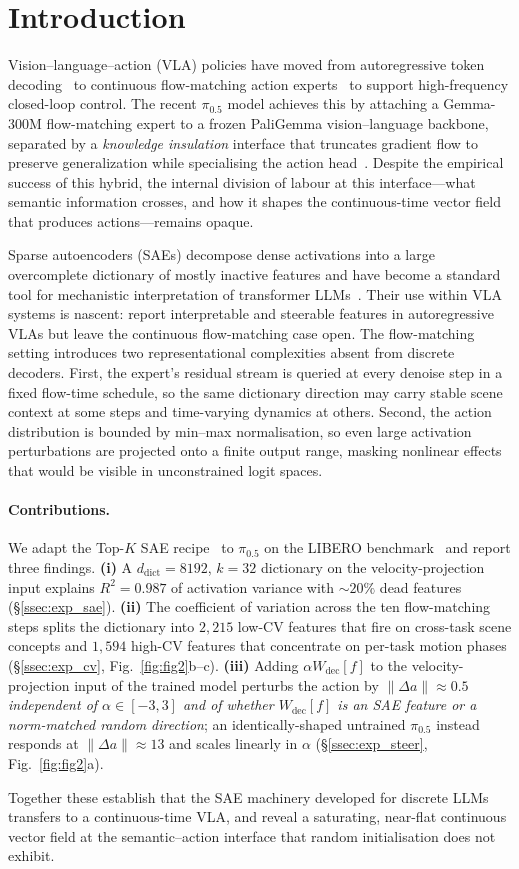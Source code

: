\section{Introduction}
\label{sec:intro}

Vision--language--action (VLA) policies have moved from autoregressive token
decoding~\citep{kim2024openvla} to continuous flow-matching action
experts~\citep{black2024pi0,black2025pi05} to support high-frequency closed-loop
control. The recent $\pi_{0.5}$ model achieves this by attaching a Gemma-300M
flow-matching expert to a frozen PaliGemma vision--language backbone, separated
by a \emph{knowledge insulation} interface that truncates gradient flow to
preserve generalization while specialising the action head~\citep{black2025pi05}.
Despite the empirical success of this hybrid, the internal division of labour
at this interface---what semantic information crosses, and how it shapes the
continuous-time vector field that produces actions---remains opaque.

Sparse autoencoders (SAEs) decompose dense activations into a large
overcomplete dictionary of mostly inactive features and have become a
standard tool for mechanistic interpretation of transformer
LLMs~\citep{cunningham2023sparse,bricken2023monosemanticity,gao2024scaling}.
Their use within VLA systems is nascent: \citet{swann2026sae} report
interpretable and steerable features in autoregressive VLAs but leave the
continuous flow-matching case open. The flow-matching setting introduces two
representational complexities absent from discrete decoders. First, the
expert's residual stream is queried at every denoise step in a fixed flow-time
schedule, so the same dictionary direction may carry stable scene context at
some steps and time-varying dynamics at others. Second, the action distribution
is bounded by min--max normalisation, so even large activation perturbations
are projected onto a finite output range, masking nonlinear effects that would
be visible in unconstrained logit spaces.

\paragraph{Contributions.}
We adapt the Top-$K$ SAE recipe~\citep{gao2024scaling} to $\pi_{0.5}$ on the
LIBERO benchmark~\citep{liu2023libero} and report three findings.
\textbf{(i)} A $d_\text{dict}{=}8192$, $k{=}32$ dictionary on the
velocity-projection input explains $R^2{=}0.987$ of activation variance with
$\sim$$20\%$ dead features (\S\ref{ssec:exp_sae}).
\textbf{(ii)} The coefficient of variation across the ten flow-matching steps
splits the dictionary into $2{,}215$ low-CV features that fire on cross-task
scene concepts and $1{,}594$ high-CV features that concentrate on per-task
motion phases (\S\ref{ssec:exp_cv}, Fig.~\ref{fig:fig2}b--c).
\textbf{(iii)} Adding $\alpha W_\text{dec}[f]$ to the velocity-projection input
of the trained model perturbs the action by $\|\Delta a\|{\approx}0.5$
\emph{independent of $\alpha\in[-3,3]$ and of whether $W_\text{dec}[f]$ is an SAE
feature or a norm-matched random direction}; an identically-shaped untrained
$\pi_{0.5}$ instead responds at $\|\Delta a\|{\approx}13$ and scales linearly
in $\alpha$ (\S\ref{ssec:exp_steer}, Fig.~\ref{fig:fig2}a).

Together these establish that the SAE machinery developed for discrete LLMs
transfers to a continuous-time VLA, and reveal a saturating, near-flat
continuous vector field at the semantic--action interface that random
initialisation does not exhibit.
